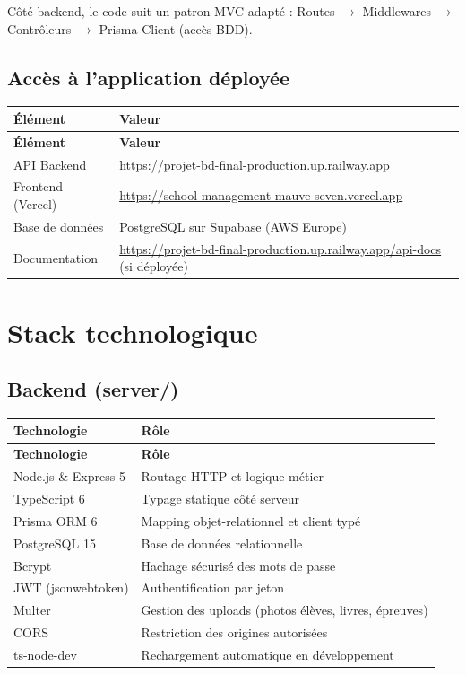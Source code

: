 \documentclass[12pt,a4paper]{report}
\begin{document}
Côté backend, le code suit un patron MVC adapté : Routes $\rightarrow$ Middlewares $\rightarrow$ Contrôleurs $\rightarrow$ Prisma Client (accès BDD).

\subsection*{Accès à l'application déployée}
\begin{longtable}{|p{4cm}|p{10.5cm}|}
\hline
\textbf{Élément} & \textbf{Valeur} \\
\hline
\endfirsthead
\hline
\textbf{Élément} & \textbf{Valeur} \\
\hline
\endhead
API Backend & \url{https://projet-bd-final-production.up.railway.app} \\
\hline
Frontend (Vercel) & \url{https://school-management-mauve-seven.vercel.app} \\
\hline
Base de données & PostgreSQL sur Supabase (AWS Europe) \\
\hline
Documentation & \url{https://projet-bd-final-production.up.railway.app/api-docs} (si déployée) \\
\hline
\end{longtable}
 
\section{Stack technologique}
 
\subsection*{Backend (server/)}
\begin{longtable}{|p{4.5cm}|p{10cm}|}
\hline
\textbf{Technologie} & \textbf{Rôle} \\
\hline
\endfirsthead
\hline
\textbf{Technologie} & \textbf{Rôle} \\
\hline
\endhead
Node.js \& Express 5 & Routage HTTP et logique métier \\
\hline
TypeScript 6 & Typage statique côté serveur \\
\hline
Prisma ORM 6 & Mapping objet-relationnel et client typé \\
\hline
PostgreSQL 15 & Base de données relationnelle \\
\hline
Bcrypt & Hachage sécurisé des mots de passe \\
\hline
JWT (jsonwebtoken) & Authentification par jeton \\
\hline
Multer & Gestion des uploads (photos élèves, livres, épreuves) \\
\hline
CORS & Restriction des origines autorisées \\
\hline
ts-node-dev & Rechargement automatique en développement \\
\hline
\end{longtable}
 
\end{document}
